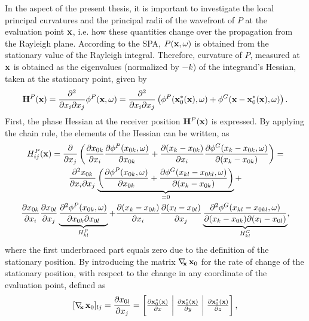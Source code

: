 In the aspect of the present thesis, it is important to investigate the local principal curvatures and the principal radii of the wavefront of $P$ at the evaluation point $\mathbf{x}$, i.e. how these quantities change over the propagation from the Rayleigh plane.
According to the SPA, $P(\mathbf{x},\omega)$ is obtained from the stationary value of the Rayleigh integral.
Therefore, curvature of $P$, measured at $\mathbf{x}$ is obtained as the eigenvalues (normalized by $-k$) of the integrand's Hessian, taken at the stationary point, given by
\begin{equation}
\mathbf{H}^{P}(\mathbf{x}) = \frac{\partial^2}{\partial x_{i} \partial x_{j}} \phi^P ( \mathbf{x},\omega) = \frac{\partial^2}{\partial x_{i} \partial x_{j}}\left( \phi^P(\mathbf{x}_0^*(\mathbf{x}),\omega) + \phi^G(\mathbf{x}-\mathbf{x}_0^*(\mathbf{x}),\omega) \right).
\end{equation}
First, the phase Hessian at the receiver position $\mathbf{H}^{P}(\mathbf{x})$ is expressed.
By applying the chain rule, the elements of the Hessian can be written, as
\begin{multline}
H_{ij}^P(\mathbf{x}) 
= 
\frac{\partial}{\partial x_{j}} \left( \frac{\partial x_{0 k}}{\partial x_{i} } \frac{\partial \phi^P(x_{0 k},\omega)}{\partial x_{0 k} } + 
\frac{\partial ( x_k - x_{0 k}) }{\partial x_{i} }  \frac{\partial \phi^G(x_k-x_{0 k},\omega)}{\partial( x_k - x_{0 k}) }   \right) = \\
\frac{\partial^2 x_{0 k}}{\partial x_{i} \partial x_{j}} 
\underbrace{
\left( \frac{\partial \phi^P(x_{0 k},\omega)}{\partial x_{0 k} } 
+ \frac{\partial \phi^G(x_{kl}-x_{0 kl},\omega)}{\partial( x_k - x_{0 k}) } \right)}_{ = 0} +
\\ 
 \frac{\partial x_{0 k}}{\partial x_{i} } \frac{\partial x_{0 l}}{\partial x_{j}} 
\underbrace{ \frac{\partial^2 \phi^P(x_{0 k},\omega)}{\partial x_{0 k}\partial x_{0 l} }}_{H^P_{kl}}
+  \frac{\partial ( x_{k} - x_{0 k}) }{\partial x_{i} } 
 \frac{\partial ( x_{l} - x_{0 l}) }{\partial x_{j} }
\underbrace{ \frac{\partial^2 \phi^G(x_{kl}-x_{0 kl},\omega)}{\partial( x_k - x_{0 k}) \partial ( x_{l} - x_{0 l})} }_{H^G_{kl}},
\end{multline}
where the first underbraced part equals zero due to the definition of the stationary position.
By introducing the matrix $\nabla_{\!\!\mathbf{x}}\, \mathbf{x}_0$ for the rate of change of the stationary position, with respect to the change in any coordinate of the evaluation point, defined as
\begin{equation}
\label{eq:app:stat_point_grad}
[\Dx \vxo]_{lj} =  \frac{\partial x_{0 l}	}{\partial x_j} =  
\begin{bmatrix} \frac{\partial \vxo^*(\vx)}{\partial x} \hspace{1mm} \bigg| & \hspace{-2.5mm}  \frac{\partial \vxo^*(\vx)}{ \partial y} \hspace{1mm} \bigg| & \hspace{-2.5mm} \frac{\partial \vxo^*(\vx)}{ \partial z} 
 \\[.3em] \end{bmatrix},
\end{equation}
